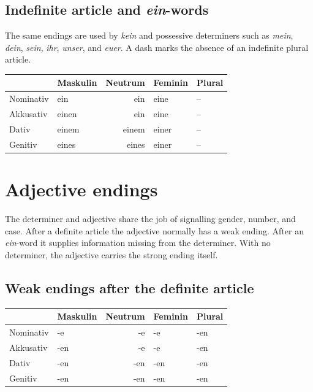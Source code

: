 \subsection{Indefinite article and \textit{ein}-words}

The same endings are used by \textit{kein} and possessive determiners such as
\textit{mein}, \textit{dein}, \textit{sein}, \textit{ihr}, \textit{unser}, and
\textit{euer}. A dash marks the absence of an indefinite plural article.

\begin{center}
\begin{tabular}{@{}lMNFP@{}}
\toprule
 & Maskulin & Neutrum & Feminin & Plural \\
\midrule
{}
Nominativ & ein & ein & eine & -- \\
Akkusativ & einen & ein & eine & -- \\
Dativ & einem & einem & einer & -- \\
Genitiv & eines & eines & einer & -- \\
\bottomrule
\end{tabular}
\end{center}

\section{Adjective endings}
\label{sec:adjective-endings}

The determiner and adjective share the job of signalling gender, number, and
case. After a definite article the adjective normally has a weak ending. After
an \textit{ein}-word it supplies information missing from the determiner. With
no determiner, the adjective carries the strong ending itself.

\subsection{Weak endings after the definite article}

\begin{center}
\begin{tabular}{@{}lMNFP@{}}
\toprule
 & Maskulin & Neutrum & Feminin & Plural \\
\midrule
{}
Nominativ & -e & -e & -e & -en \\
Akkusativ & -en & -e & -e & -en \\
Dativ & -en & -en & -en & -en \\
Genitiv & -en & -en & -en & -en \\
\bottomrule
\end{tabular}
\end{center}

